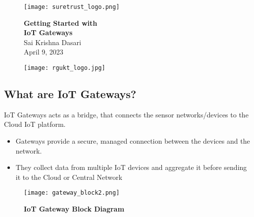 \documentclass[12pt]{article}
\begin{document}
\begin{figure}[h]
  \centering
  \begin{minipage}[h]{0.2\textwidth}
    \centering
    \texttt{[image: suretrust\_logo.png]}
  \end{minipage}
  \hfill
  \begin{minipage}[h]{0.58\textwidth}
  \vspace{0.9cm}
    \centering
    {\LARGE \textbf{Getting Started with \\IoT Gateways}\\}
	\vspace{0.3cm}
	Sai Krishna Dasari \\
	\vspace{0.3cm}
	April 9, 2023\\
  \end{minipage}
  \hfill
  \begin{minipage}[h]{0.2\textwidth}
    \centering
    \texttt{[image: rgukt\_logo.jpg]}
  \end{minipage}
  
\end{figure}

\begin{flushleft}
\section{\textbf{What are IoT Gateways?\\}}
\end{flushleft}
IoT Gateways acts as a bridge, that connects the sensor networks/devices to the Cloud IoT platform.

\begin{itemize}
\item Gateways provide a secure, managed connection between the devices and the network.

\item They collect data from multiple IoT devices and aggregate it before sending it to the Cloud or Central Network
\end{itemize}
 \begin{figure}[h]
\centering
\texttt{[image: gateway\_block2.png]}
\caption{\textbf{IoT Gateway Block Diagram}}
\label{gateway_block}
\end{figure} 
\pagebreak
\end{document}
